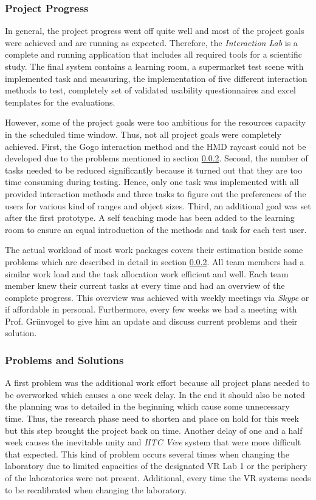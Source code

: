 \subsubsection{Project Progress}

In general, the project progress went off quite well and most of the project goals were achieved and are running as expected. Therefore, the \textit{Interaction Lab} is a complete and running application that includes all required tools for a scientific study. The final system contains a learning room, a supermarket test scene with implemented task and measuring, the implementation of five different interaction methods to test, completely set of validated usability questionnaires and excel templates for the evaluations.

However, some of the project goals were too ambitious for the resources capacity in the scheduled time window. Thus, not all project goals were completely achieved. First, the Gogo interaction method and the HMD raycast could not be developed due to the problems mentioned in section \ref{sec:PMProblems}. Second, the number of tasks needed to be reduced significantly because it turned out that they are too time consuming during testing. Hence, only one task was implemented with all provided interaction methods and three tasks to figure out the preferences of the users for various kind of ranges and object sizes. Third, an additional goal was set after the first prototype. A self teaching mode has been added to the learning room to ensure an equal introduction of the methods and task for each test user.

The actual workload of most work packages covers their estimation beside some problems which are described in detail in section \ref{sec:PMProblems}. All team members had a similar work load and the task allocation work efficient and well. Each team member knew their current tasks at every time and had an overview of the complete progress. This overview was achieved with weekly meetings via \textit{Skype} or if affordable in personal. Furthermore, every few weeks we had a meeting with Prof. Grünvogel to give him an update and discuss current problems and their solution.


\subsubsection{Problems and Solutions}\label{sec:PMProblems}

A first problem was the additional work effort because all project plans needed to be overworked which causes a one week delay. In the end it should also be noted the planning was to detailed in the beginning which cause some unnecessary time. Thus, the research phase need to shorten and place on hold for this week but this step brought the project back on time. Another delay of one and a half week causes the inevitable unity and \textit{HTC Vive} system that were more difficult that expected. This kind of problem occurs several times when changing the laboratory due to limited capacities of the designated VR Lab 1 or the periphery of the laboratories were not present. Additional, every time the VR systems needs to be recalibrated when changing the laboratory.

